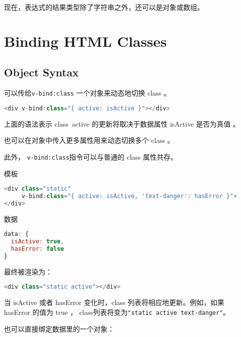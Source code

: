 现在，表达式的结果类型除了字符串之外，还可以是对象或数组。


\section{Binding HTML Classes}



\subsection{Object Syntax}

可以传给\texttt{v-bind:class} 一个对象来动态地切换 class 。

\begin{lstlisting}[language=JavaScript]
<div v-bind:class="{ active: isActive }"></div>
\end{lstlisting}

上面的语法表示 class~active 的更新将取决于数据属性 isActive 是否为真值 。

也可以在对象中传入更多属性用来动态切换多个 class 。

此外， \texttt{v-bind:class}指令可以与普通的 class 属性共存。

\begin{compactitem}
\item 模板

\begin{lstlisting}[language=JavaScript]
<div class="static"
     v-bind:class="{ active: isActive, 'text-danger': hasError }">
</div>
\end{lstlisting}

\item 数据

\begin{lstlisting}[language=JavaScript]
data: {
  isActive: true,
  hasError: false
}
\end{lstlisting}
\end{compactitem}



最终被渲染为：


\begin{lstlisting}[language=JavaScript]
<div class="static active"></div>
\end{lstlisting}

当 isActive 或者 hasError 变化时，class 列表将相应地更新。例如，如果 hasError 的值为 true ， class列表将变为\texttt{"static active text-danger"}。

也可以直接绑定数据里的一个对象：

